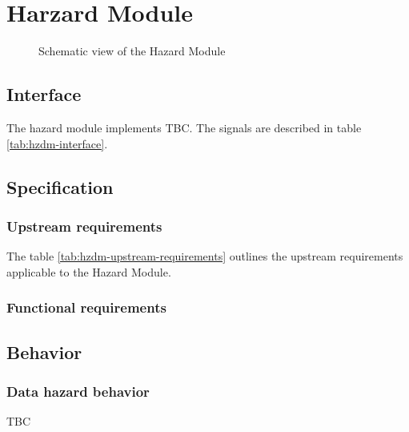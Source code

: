 \section{Harzard Module}

  \begin{figure}[h!]
      \centering
      
      \caption{Schematic view of the Hazard Module}
      \label{fig:hzdm}
    \end{figure}

  \subsection{Interface}

    \begin{content}
        The hazard module implements TBC. The signals are described in table \ref{tab:hzdm-interface}. 
      \end{content}

    

  \subsection{Specification}

    \subsubsection{Upstream requirements}

      The table \ref{tab:hzdm-upstream-requirements} outlines the upstream requirements applicable to the Hazard Module.

      

    \subsubsection{Functional requirements}

  \subsection{Behavior}

    \subsubsection{Data hazard behavior}

      \begin{content}
          TBC
        \end{content}

